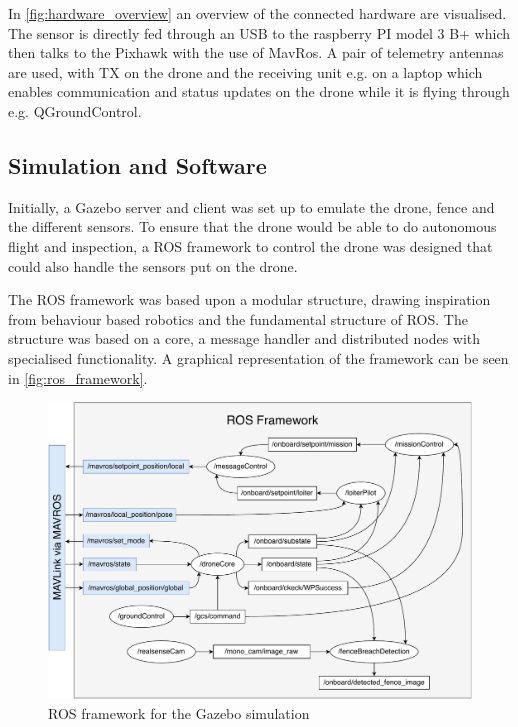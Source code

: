 \documentclass[../Head/Main.tex]{subfiles}
\begin{document}
In \autoref{fig:hardware_overview} an overview of the connected hardware are visualised. The sensor is directly fed through an USB to the raspberry PI model 3 B+ which then talks to the Pixhawk with the use of MavRos. A pair of telemetry antennas are used, with TX on the drone and the receiving unit e.g. on a laptop which enables communication and status updates on the drone while it is flying through e.g. QGroundControl.  

\clearpage
\subsection{Simulation and Software}
\label{subsec:simulation}
Initially, a Gazebo server and client was set up to emulate the drone, fence and the different sensors. To ensure that the drone would be able to do autonomous flight and inspection, a ROS framework to control the drone was designed that could also handle the sensors put on the drone.\par 
The ROS framework was based upon a modular structure, drawing inspiration from behaviour based robotics and the fundamental structure of ROS. The structure was based on a core, a message handler and distributed nodes with specialised functionality. 
A graphical representation of the framework can be seen in \autoref{fig:ros_framework}.

\begin{figure}[H]
    \centering
    \includegraphics[width=\textwidth]{../Figures/simulation/ROS_framework.pdf}
    \caption{ROS framework for the Gazebo simulation}
    \label{fig:ros_framework}
\end{figure}
\end{document}
